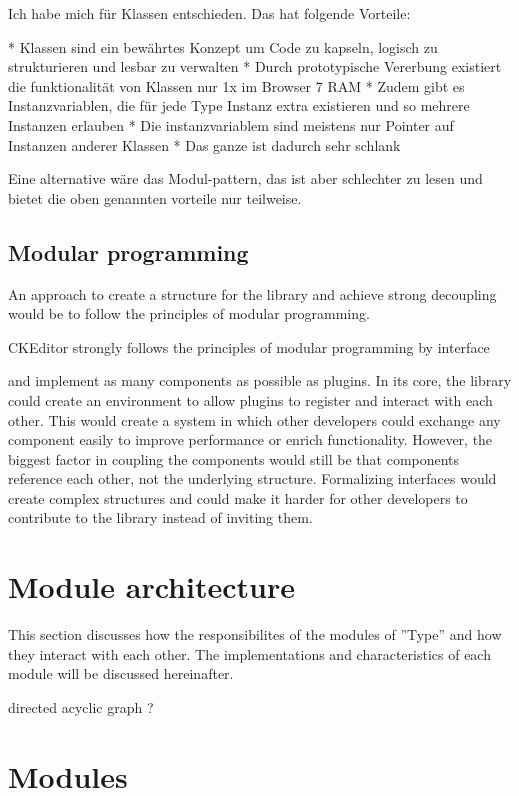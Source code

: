 Ich habe mich für Klassen entschieden. Das hat folgende Vorteile:

* Klassen sind ein bewährtes Konzept um Code zu kapseln, logisch zu strukturieren und lesbar zu verwalten
* Durch prototypische Vererbung existiert die funktionalität von Klassen nur 1x im Browser 7 RAM
* Zudem gibt es Instanzvariablen, die für jede Type Instanz extra existieren und so mehrere Instanzen erlauben
* Die instanzvariablem sind meistens nur Pointer auf Instanzen anderer Klassen
* Das ganze ist dadurch sehr schlank

Eine alternative wäre das Modul-pattern, das ist aber schlechter zu lesen und bietet die oben genannten vorteile nur teilweise.


\subsection{Modular programming}

An approach to create a structure for the library and achieve strong decoupling would be to follow the principles of modular programming.

CKEditor strongly follows the principles of modular programming by interface

 and implement as many components as possible as plugins. In its core, the library could create an environment to allow plugins to register and interact with each other. This would create a system in which other developers could exchange any component easily to improve performance or enrich functionality. However, the biggest factor in coupling the components would still be that components reference each other, not the underlying structure. Formalizing interfaces would create complex structures and could make it harder for other developers to contribute to the library instead of inviting them.


\section{Module architecture}

This section discusses how the responsibilites of the modules of ''Type'' and how they interact with each other. The implementations and characteristics of each module will be discussed hereinafter.

directed acyclic graph ? 

\section{Modules}

